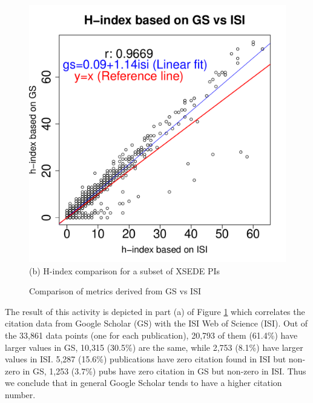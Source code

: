 \documentclass{sig-alternate}
\begin{document}
\begin{figure}[!htb]
\begin{minipage}[t]{0.22\textwidth}
    \includegraphics[width=1.0\columnwidth]{images/11_gs_vs_isi_hindex_bigfont.pdf} 
    (b) H-index comparison for a subset of XSEDE PIs
\end{minipage}

\caption{Comparison of metrics derived from GS vs ISI}\label{F:gs-vs-isi}
\end{figure}

% 
 
The result of this activity is depicted in part (a) of Figure \ref{F:gs-vs-isi} which correlates the citation data from Google Scholar (GS) with the ISI Web of Science (ISI). Out of the 33,861 data points (one for each publication), 20,793 of them (61.4\%) have larger values in GS, 10,315 (30.5\%) are the same, while 2,753 (8.1\%) have larger values in ISI. 5,287 (15.6\%) publications have zero citation found in ISI but non-zero in GS, 1,253 (3.7\%) pubs have zero citation in GS but non-zero in ISI. Thus we conclude that in general Google Scholar tends to have a higher citation number. 
 
\end{document}
